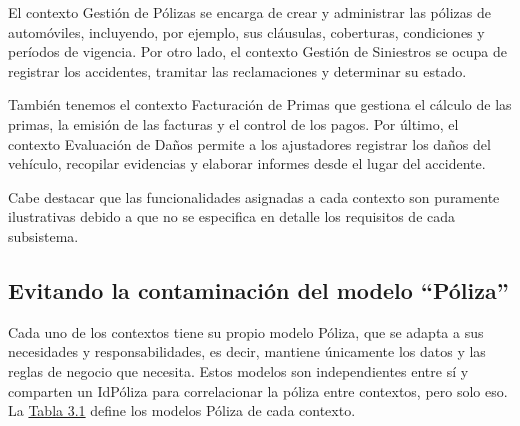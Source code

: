 \documentclass[12pt, a4paper]{article}
\begin{document}
        El contexto Gestión de Pólizas se encarga de crear y administrar las pólizas de automóviles, incluyendo, por ejemplo, sus cláusulas, coberturas, condiciones y períodos de vigencia. Por otro lado, el contexto Gestión de Siniestros se ocupa de registrar los accidentes, tramitar las reclamaciones y determinar su estado.

        También tenemos el contexto Facturación de Primas que gestiona el cálculo de las primas, la emisión de las facturas y el control de los pagos. Por último, el contexto Evaluación de Daños permite a los ajustadores registrar los daños del vehículo, recopilar evidencias y elaborar informes desde el lugar del accidente.

        Cabe destacar que las funcionalidades asignadas a cada contexto son puramente ilustrativas debido a que no se especifica en detalle los requisitos de cada subsistema.

        \subsection{Evitando la contaminación del modelo ``Póliza''}

        Cada uno de los contextos tiene su propio modelo Póliza, que se adapta a sus necesidades y responsabilidades, es decir, mantiene únicamente los datos y las reglas de negocio que necesita. Estos modelos son independientes entre sí y comparten un IdPóliza para correlacionar la póliza entre contextos, pero solo eso. La \hyperref[tab:Tabla3.1]{Tabla 3.1} define los modelos Póliza de cada contexto.
\end{document}
